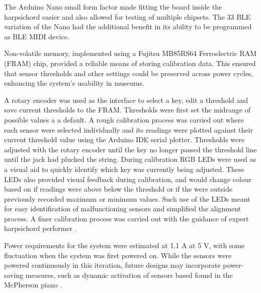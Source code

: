 The Arduino Nano small form factor made fitting the board inside the harpsichord easier and also allowed for testing of multiple chipsets. The 33 BLE variation of the Nano had the additional benefit in its ability to be programmed as BLE MIDI device.  

Non-volatile memory, implemented using a Fujitsu MB85RS64 Ferroelectric RAM (FRAM) chip, provided a reliable means of storing calibration data. This ensured that sensor thresholds and other settings could be preserved across power cycles, enhancing the system's usability in museums.


A rotary encoder was used as the interface to select a key, edit a threshold and save current thresholds to the FRAM.
Thresholds were first set the midrange of possible values a a default. A rough calibration process was carried out where each sensor were selected individually and its readings were plotted against their current threshold value using the Arduino IDE serial plotter. Thresholds were adjusted with the rotary encoder until the key no longer passed the threshold line until the jack had plucked the string. During calibration RGB LEDs were used as a visual aid to quickly identify which key was currently being adjusted. These LEDs also provided visual feedback during calibration, and would change colour based on if readings were above below the threshold or if the were outside previously recorded maximum or minimum values. Such use of the LEDs meant for easy identification of malfunctioning sensors and simplified the alignment process. A finer calibration process was carried out with the guidance of expert harpsichord performer .

Power requirements for the system were estimated at 1.1 A at 5 V, with some fluctuation when the system was first powered on. While the sensors were powered continuously in this iteration, future designs may incorporate power-saving measures, such as dynamic activation of sensors based found in the McPherson piano \cite{McPherson2013}.

